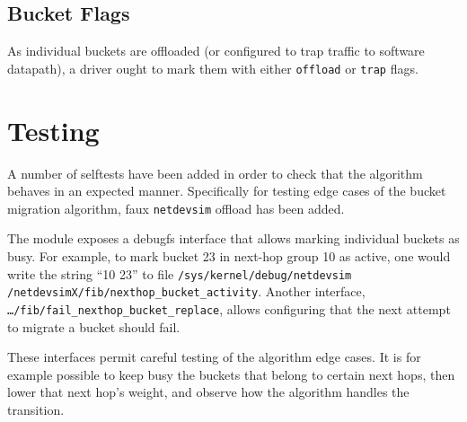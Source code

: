 \documentclass[letterpaper]{article}
\begin{document}
\subsection{Bucket Flags}

As individual buckets are offloaded (or configured to trap traffic to
software datapath), a driver ought to mark them with either
\texttt{offload} or \texttt{trap} flags.

\section{Testing}

A number of selftests have been added in order to check that the algorithm
behaves in an expected manner. Specifically for testing edge cases of the
bucket migration algorithm, faux \texttt{netdevsim} offload has been added.

The module exposes a debugfs interface that allows marking individual
buckets as busy. For example, to mark bucket 23 in next-hop group 10 as
active, one would write the string ``10 23'' to file
\texttt{/sys/kernel/debug/netdevsim\\/netdevsimX/fib/nexthop\_bucket\_activity}.
Another interface, \texttt{\ldots/fib/fail\_nexthop\_bucket\_replace},
allows configuring that the next attempt to migrate a bucket should fail.

These interfaces permit careful testing of the algorithm edge cases. It is
for example possible to keep busy the buckets that belong to certain next
hops, then lower that next hop's weight, and observe how the algorithm
handles the transition.



\end{document}
